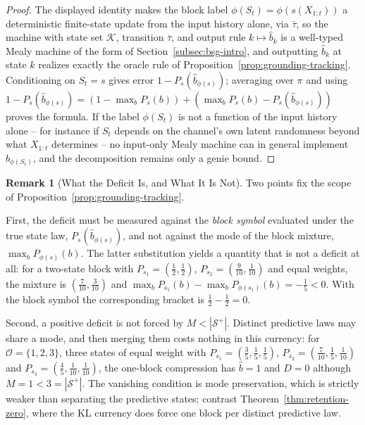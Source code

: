 \documentclass[12pt]{article}
\theoremstyle{definition}
\newtheorem{remark}[theorem]{Remark}
\newcommand{\Splus}{\mathcal S^{+}}
\begin{document}
\begin{proof}
The displayed identity makes the block label $\phi(S_t)=\phi(s(X_{1:t}))$ a
deterministic finite-state update from the input history alone, via
$\bar\tau$, so the machine with state set $\mathcal K$, transition
$\bar\tau$, and output rule $k\mapsto\hat b_k$ is a well-typed Mealy machine
of the form of Section~\ref{subsec:bsg-intro}, and outputting $\hat b_k$ at
state $k$ realizes exactly the oracle rule of
Proposition~\ref{prop:grounding-tracking}.  Conditioning on $S_t=s$ gives
error $1-P_s(\hat b_{\phi(s)})$; averaging over $\pi$ and using
$1-P_s(\hat b_{\phi(s)})=(1-\max_bP_s(b))+
(\max_bP_s(b)-P_s(\hat b_{\phi(s)}))$ proves the formula.  If the label
$\phi(S_t)$ is not a function of the input history alone -- for instance if
$S_t$ depends on the channel's own latent randomness beyond what
$X_{1:t}$ determines -- no input-only Mealy machine can in general implement
$\hat b_{\phi(S_t)}$, and the decomposition remains only a genie bound.
\end{proof}

\begin{remark}[What the Deficit Is, and What It Is Not]
\label{rem:tracking-deficit-scope}
Two points fix the scope of Proposition~\ref{prop:grounding-tracking}.

First, the deficit must be measured against the \emph{block symbol} evaluated
under the true state law, $P_s(\hat b_{\phi(s)})$, and not against the mode of
the block mixture, $\max_bP_{\phi(s)}(b)$.  The latter substitution yields a
quantity that is not a deficit at all: for a two-state block with
$P_{s_1}=(\tfrac12,\tfrac12)$, $P_{s_2}=(\tfrac9{10},\tfrac1{10})$ and equal
weights, the mixture is $(\tfrac7{10},\tfrac3{10})$ and
$\max_bP_{s_1}(b)-\max_bP_{\phi(s_1)}(b)=-\tfrac15<0$.  With the block symbol
the corresponding bracket is $\tfrac12-\tfrac12=0$.

Second, a positive deficit is not forced by $M<|\Splus|$.  Distinct predictive
laws may share a mode, and then merging them costs nothing in this currency:
for $\mathcal O=\{1,2,3\}$, three states of equal weight with
$P_{s_1}=(\tfrac35,\tfrac15,\tfrac15)$,
$P_{s_2}=(\tfrac7{10},\tfrac15,\tfrac1{10})$ and
$P_{s_3}=(\tfrac45,\tfrac1{10},\tfrac1{10})$, the one-block compression has
$\hat b=1$ and $D=0$ although $M=1<3=|\Splus|$.  The vanishing condition is
mode preservation, which is strictly weaker than separating the predictive
states; contrast Theorem~\ref{thm:retention-zero}, where the KL currency does
force one block per distinct predictive law.
\end{remark}
\end{document}
